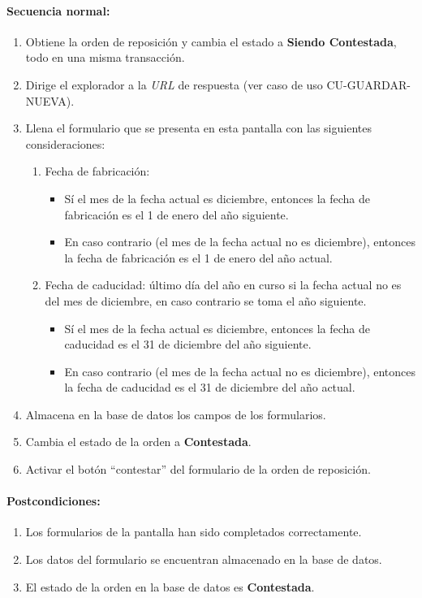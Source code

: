 \paragraph{Secuencia normal:}
\begin{enumerate}
  \item Obtiene la orden de reposición y cambia el estado a \textbf{Siendo Contestada}, todo en una misma transacción.
  \item Dirige el explorador a la \textit{URL} de respuesta (ver caso de uso CU-GUARDAR-NUEVA).
  \item Llena el formulario que se presenta en esta pantalla con las siguientes consideraciones:
  \begin{enumerate}
    \item Fecha de fabricación:
    \begin{itemize}
      \item Sí el mes de la fecha actual es diciembre, entonces la fecha de fabricación es el 1 de enero del año siguiente.
      \item En caso contrario (el mes de la fecha actual no es diciembre), entonces la fecha de fabricación es el 1 de enero del año actual.
    \end{itemize}
    \item Fecha de caducidad: último día del año en curso si la fecha actual no es del mes de diciembre, en caso contrario se toma el año siguiente.
    \begin{itemize}
      \item Sí el mes de la fecha actual es diciembre, entonces la fecha de caducidad es el 31 de diciembre del año siguiente.
      \item En caso contrario (el mes de la fecha actual no es diciembre), entonces la fecha de caducidad es el 31 de diciembre del año actual.
    \end{itemize}
  \end{enumerate}
  \item Almacena en la base de datos los campos de los formularios.
  \item Cambia el estado de la orden a \textbf{Contestada}.
  \item Activar el botón ``contestar'' del formulario de la orden de reposición.
\end{enumerate}
\paragraph{Postcondiciones:}
\begin{enumerate}
  \item Los formularios de la pantalla han sido completados correctamente.
  \item Los datos del formulario se encuentran almacenado en la base de datos.
  \item El estado de la orden en la base de datos es \textbf{Contestada}.
\end{enumerate}
